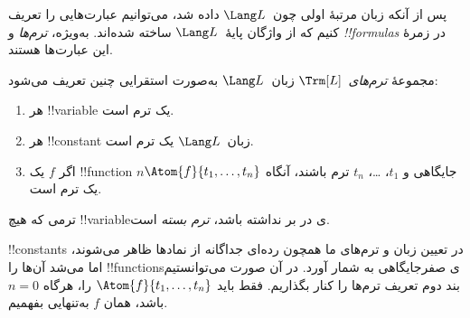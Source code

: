 \documentclass[../../../include/open-logic-section]{subfiles}
\begin{document}


پس از آنکه زبان مرتبهٔ اولی چون~$\Lang L$ داده شد، می‌توانیم عبارت‌هایی را
تعریف کنیم که از واژگان پایهٔ~$\Lang L$ ساخته شده‌اند. به‌ویژه،
\emph{ترم‌ها} و \emph{!!{formula}s} در زمرهٔ این عبارت‌ها هستند.

\begin{defn}[ترم‌ها]
مجموعهٔ \emph{ترم‌های}~$\Trm[L]$ زبان~$\Lang L$ به‌صورت استقرایی چنین
تعریف می‌شود:
\begin{enumerate}
\item هر !!{variable} یک ترم است.
\item هر !!{constant} زبان~$\Lang L$ یک ترم است.
\item اگر $f$ یک !!{function} $n$جایگاهی و $t_1$، \dots، $t_n$ ترم باشند،
  آنگاه $\Atom{f}{t_1, \ldots, t_n}$ یک ترم است.
\end{enumerate}
ترمی که هیچ !!{variable}ی در بر نداشته باشد، \emph{ترم بسته} است.
\end{defn}

\begin{explain}
!!{constant}s در تعیین زبان و ترم‌های ما همچون رده‌ای جداگانه از نمادها
ظاهر می‌شوند، اما می‌شد آن‌ها را !!{function}sی صفرجایگاهی به شمار آورد.
در آن صورت می‌توانستیم بند دوم تعریف ترم‌ها را کنار بگذاریم. فقط باید
$\Atom{f}{t_1, \ldots, t_n}$ را، هرگاه $n = 0$ باشد، همان $f$ به‌تنهایی
بفهمیم.
\end{explain}
\end{document}
